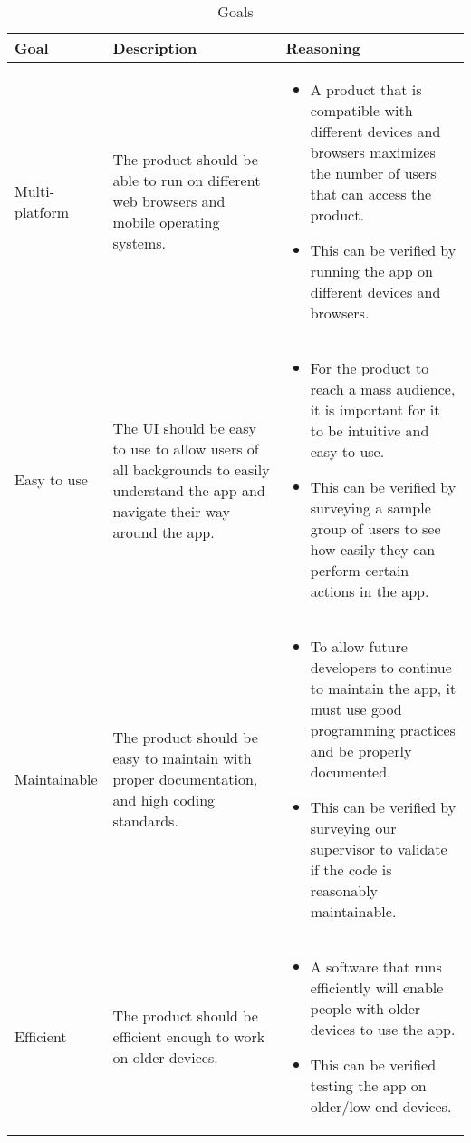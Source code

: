 \documentclass{article}
\begin{document}
\begin{center}
    \begin{longtable}{ | p{3cm} | p{4cm} | p{4.5cm} |}
    \caption{Goals}
    \label{tab:goals}
    \\ \hline
    \textbf{Goal} & \textbf{Description} & \textbf{Reasoning} \\ \hline
    Multi-platform & 
    The product should be able to run on different web browsers and mobile operating systems. &  
    \begin{itemize}[noitemsep,nolistsep,leftmargin=*]
        \item A product that is compatible with different devices and browsers maximizes the number of users that can access the product.
        \item This can be verified by running the app on different devices and browsers.
    \end{itemize}
\\ \hline

    Easy to use & 
    The UI should be easy to use to allow users of all backgrounds to easily understand the app and navigate their way around the app.  &  
    \begin{itemize}[noitemsep,nolistsep,leftmargin=*]
        \item For the product to reach a mass audience, it is important for it to be intuitive and easy to use.
        \item This can be verified by surveying a sample group of users to see how easily they can perform certain actions in the app.
    \end{itemize}
\\ \hline

    Maintainable & 
    The product should be easy to maintain with proper documentation, and high coding standards.  &  
    \begin{itemize}[noitemsep,nolistsep,leftmargin=*]
        \item To allow future developers to continue to maintain the app, it must use good programming practices and be properly documented.
        \item This can be verified by surveying our supervisor to validate if the code is reasonably maintainable.
    \end{itemize}
\\ \hline

    Efficient & 
    The product should be efficient enough to work on older devices.  &  
    \begin{itemize}[noitemsep,nolistsep,leftmargin=*]
        \item A software that runs efficiently will enable people with older devices to use the app.
        \item This can be verified testing the app on older/low-end devices.
    \end{itemize}
\\ \hline


\end{longtable}
\end{center}
\end{document}
